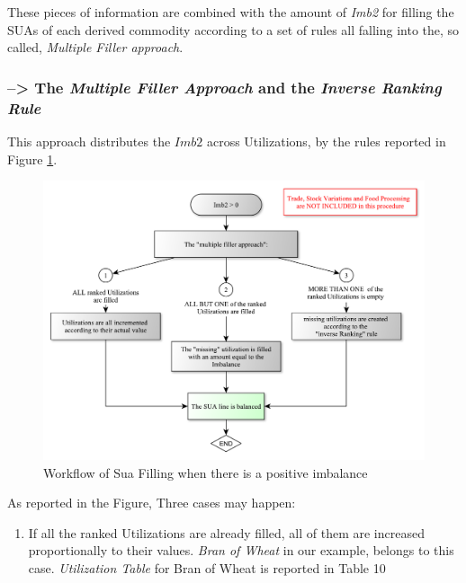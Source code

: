 \documentclass[]{article}
\providecommand{\tightlist}{%
  \setlength{\itemsep}{0pt}\setlength{\parskip}{0pt}}
\begin{document}
These pieces of information are combined with the amount of \emph{Imb2}
for filling the SUAs of each derived commodity according to a set of
rules all falling into the, so called, \emph{Multiple Filler approach}.

\subsubsection*{\texorpdfstring{--\textgreater{} The \emph{Multiple
Filler Approach} and the \emph{Inverse Ranking
Rule}}{--\textgreater{} The Multiple Filler Approach and the Inverse Ranking Rule}}\label{the-multiple-filler-approach-and-the-inverse-ranking-rule}

This approach distributes the \(Imb2\) across Utilizations, by the rules
reported in Figure \ref{fig:f7}.

\begin{figure}

{\centering \includegraphics{images/StandBal/07_PositiveImbalance} 

}

\caption{\label{fig:f5}Workflow of Sua Filling when there is a positive imbalance}\label{fig:f7}
\end{figure}

As reported in the Figure, Three cases may happen:

\begin{enumerate}
\def\labelenumi{\arabic{enumi}.}
\tightlist
\item
  If all the ranked Utilizations are already filled, all of them are
  increased proportionally to their values. \emph{Bran of Wheat} in our
  example, belongs to this case. \emph{Utilization Table} for Bran of
  Wheat is reported in Table 10
\end{enumerate}
\end{document}
